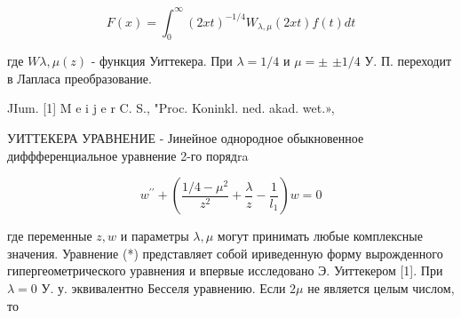 \documentclass[10pt]{article}
\begin{document}
\[

F(x)=\int_{0}^{\infty}(2 x t)^{-1 / 4} W_{\lambda, \mu}(2 x t) f(t) d t

\]



где $W \lambda, \mu(z)$ - функция Уиттекера. При $\lambda=1 / 4$ и $\mu= \pm$ $\pm 1 / 4$ У. П. переходит в Лапласа преобразование.



JIum. [1] M e i j e r C. S., "Proc. Koninkl. ned. akad. wet.»,



УИТТЕКЕРА УРАВНЕНИЕ - Јинейное однородное обыкновенное диффференциальное уравнение 2-го порядra



\[

w^{\prime \prime}+\left(\frac{1 / 4-\mu^{2}}{z^{2}}+\frac{\lambda}{z}-\frac{1}{l_{1}}\right) w=0

\]



где переменные $z, w$ и параметры $\lambda, \mu$ могут принимать любые комплексные значения. Уравнение (*) представляет собой ириведенную форму вырожденного гипергеометрического уравнения и впервые исследовано Э. Уиттекером [1]. При $\lambda=0$ У. у. эквивалентно Бесселя уравнению. Если $2 \mu$ не является целым числом, то
\end{document}
